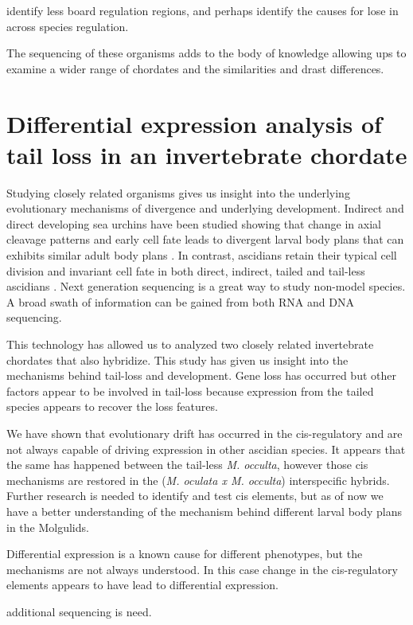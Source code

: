 identify less board regulation regions, and perhaps identify the causes for lose in across species regulation.

The sequencing of these organisms adds to the body of knowledge allowing ups to examine a wider range of chordates and the similarities and drast differences. 

\section{Differential expression analysis of tail loss in an invertebrate chordate}
Studying closely related organisms gives us insight into the underlying evolutionary mechanisms of divergence and underlying development. Indirect and direct developing sea urchins have been studied showing that change in axial cleavage patterns and early cell fate leads to divergent larval body plans that can exhibits similar adult body plans \cite{wray_evolutionary_1989,henry_evolutionary_1990}. In contrast, ascidians retain their typical cell division and invariant cell fate in both direct, indirect, tailed and tail-less ascidians \cite{jeffery_evolutionary_1991,maliska_molgula_2010}. Next generation sequencing is a great way to study non-model species. A broad swath of information can be gained from both RNA and DNA sequencing. 

This technology has allowed us to analyzed two closely related invertebrate chordates that also hybridize. This study has given us insight into the mechanisms behind tail-loss and development. Gene loss has occurred but other factors appear to be involved in tail-loss because expression from the tailed species appears to recover the loss features. 
  
We have shown that evolutionary drift has occurred in the cis-regulatory and are not always capable of driving expression in other ascidian species. It appears that the same has happened between the tail-less \textit{M. occulta}, however those cis mechanisms are restored in the (\textit{M. oculata x M. occulta}) interspecific hybrids. Further research is needed to identify and test cis elements, but as of now we have a better understanding of the mechanism behind different larval body plans in the Molgulids. 

Differential expression is a known cause for different phenotypes, but the mechanisms are not always understood. In this case change in the cis-regulatory elements appears to have lead to differential expression.

additional sequencing is need.


